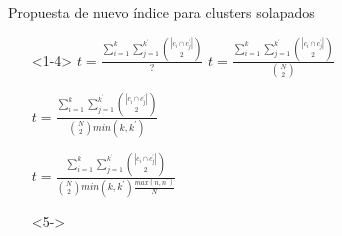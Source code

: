 \begin{frame}[t]
    \begin{block}{{Propuesta de nuevo índice para clusters solapados}}
    \begin{itemize}    
 	\item[]<1-4>
 		 {${t} = \frac
		{\sum\limits_{i=1}^{k} 
			\sum\limits_{j=1}^{k^\prime} \binom{|c_i \cap c_j^{\prime}|}{2}}
		{\textbf{?}}$}
		\only<2> {${t} = \frac
		{\sum\limits_{i=1}^{k} 
			\sum\limits_{j=1}^{k^\prime} \binom{|c_i \cap c_j^{\prime}|}{2}}
		{\binom{N}{2} }$}

 		 {${t} = \frac
		{\sum\limits_{i=1}^{k} 
			\sum\limits_{j=1}^{k^\prime} \binom{|c_i \cap c_j^{\prime}|}{2}}
		{\binom{N}{2} min(k, k^\prime) }$}
		
 		 {${t} = \frac
		{\sum\limits_{i=1}^{k} 
			\sum\limits_{j=1}^{k^\prime} \binom{|c_i \cap c_j^{\prime}|}{2}}
		{\binom{N}{2} min(k, k^\prime) \frac{max(n,n^\prime)}{N}}$}



\item[]<5-> 
	\vspace{5mm}


    \end{itemize}
	\end{block}
	
\end{frame}
